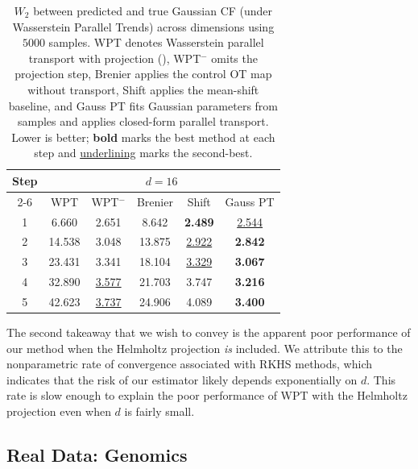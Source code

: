 \documentclass[11pt]{article}
\begin{document}
\begin{table}[h]
\vspace{0.7em}

\begin{tabular}{cccccc}
\toprule
Step & \multicolumn{5}{c}{$d=16$} \\
\cmidrule(lr){2-6}
& WPT & WPT$^-$ & Brenier & Shift & Gauss PT \\
\midrule
1 & 6.660 & 2.651 & 8.642 & \textbf{2.489} & \underline{2.544} \\
2 & 14.538 & 3.048 & 13.875 & \underline{2.922} & \textbf{2.842} \\
3 & 23.431 & 3.341 & 18.104 & \underline{3.329} & \textbf{3.067} \\
4 & 32.890 & \underline{3.577} & 21.703 & 3.747 & \textbf{3.216} \\
5 & 42.623 & \underline{3.737} & 24.906 & 4.089 & \textbf{3.400} \\
\bottomrule
\end{tabular}

\caption{$W_2$ between predicted and true Gaussian CF (under Wasserstein Parallel Trends) across dimensions using $5000$ samples. WPT denotes Wasserstein parallel transport with projection (), WPT$^-$ omits the projection step, Brenier applies the control OT map without transport, Shift applies the mean-shift baseline, and Gauss PT fits Gaussian parameters from samples and applies closed-form parallel transport. Lower is better; \textbf{bold} marks the best method at each step and \underline{underlining} marks the second-best.}
\label{tab:dim_sweep}
\end{table}



The second takeaway that we wish to convey is the apparent poor performance of our method when the Helmholtz projection \textit{is} included. We attribute this to the nonparametric rate of convergence associated with RKHS methods, which indicates that the risk of our estimator likely depends exponentially on $d$. This rate is slow enough to explain the poor performance of WPT with the Helmholtz projection even when $d$ is fairly small. 

\subsection{Real Data: Genomics} \label{sec: genomics experiments}
\end{document}
